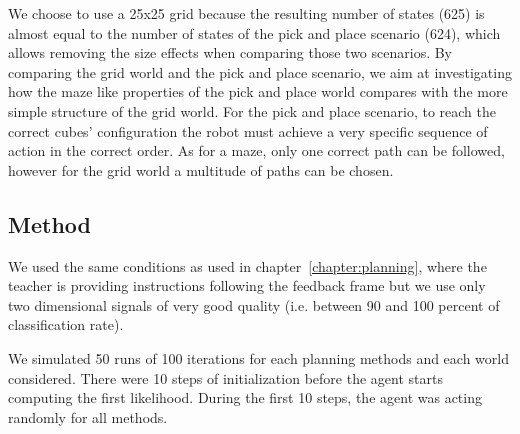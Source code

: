 We choose to use a 25x25 grid because the resulting number of states (625) is almost equal to the number of states of the pick and place scenario (624), which allows removing the size effects when comparing those two scenarios. By comparing the grid world and the pick and place scenario, we aim at investigating how the maze like properties of the pick and place world compares with the more simple structure of the grid world. For the pick and place scenario, to reach the correct cubes' configuration the robot must achieve a very specific sequence of action in the correct order. As for a maze, only one correct path can be followed, however for the grid world a multitude of paths can be chosen.


\subsection{Method}

We used the same conditions as used in chapter~\ref{chapter:planning}, where the teacher is providing instructions following the feedback frame but we use only two dimensional signals of very good quality (i.e. between 90 and 100 percent of classification rate).

We simulated 50 runs of 100 iterations for each planning methods and each world considered. There were 10 steps of initialization before the agent starts computing the first likelihood. During the first 10 steps, the agent was acting randomly for all methods.

